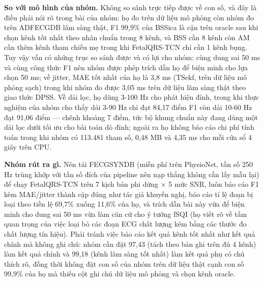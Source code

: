 \documentclass[12pt,a4paper]{article}
\begin{document}
\noindent \textbf{\color{tdtblue}So với mô hình của nhóm.} Không so sánh trực tiếp được về con số, và đây là điều phải nói rõ trong bài của nhóm: họ đo trên dữ liệu mô phỏng còn nhóm đo trên ADFECGDB lâm sàng thật, F1 99,9\% của BSSica là cận trên oracle sau khi chọn kênh tốt nhất theo nhãn chuẩn trong 8 kênh, và BSS cần 8 kênh còn AM cần thêm kênh tham chiếu mẹ trong khi FetalQRS-TCN chỉ cần 1 kênh bụng. Tuy vậy vẫn có những trục so sánh được và có lợi cho nhóm: cùng dung sai 50 ms và cùng công thức F1 nên nhóm được phép trích dẫn họ để biện minh cho lựa chọn 50 ms; về jitter, MAE tốt nhất của họ là 3,8 ms (TSekf, trên dữ liệu mô phỏng sạch) trong khi nhóm đo được 3,05 ms trên dữ liệu lâm sàng thật theo giao thức DPSS. Về dải lọc, họ dùng 3-100 Hz cho phát hiện đỉnh, trong khi thực nghiệm của nhóm cho thấy dải 3-90 Hz chỉ đạt 84,17 điểm F1 còn dải 10-60 Hz đạt 91,06 điểm — chênh khoảng 7 điểm, tức bộ khung chuẩn này đang dùng một dải lọc dưới tối ưu cho bài toán dò đỉnh; ngoài ra họ không báo cáo chi phí tính toán trong khi nhóm có 113.481 tham số, 0,48 MB và 4,35 ms cho mỗi cửa sổ 4 giây trên CPU.\par\vspace{3pt}
\noindent \textbf{\color{tdtblue}Nhóm rút ra gì.} Nên tải FECGSYNDB (miễn phí trên PhysioNet, tần số 250 Hz trùng khớp với tần số đích của pipeline nên nạp thẳng không cần lấy mẫu lại) để chạy FetalQRS-TCN trên 7 kịch bản phi dừng × 5 mức SNR, luôn báo cáo F1 kèm MAE/jitter thành cặp đúng như tác giả khuyến nghị, báo cáo tỉ lệ đoạn bị loại theo tiền lệ 69,7\% xuống 11,6\% của họ, và trích dẫn bài này vừa để biện minh cho dung sai 50 ms vừa làm căn cứ cho ý tưởng fSQI (họ viết rõ về tầm quan trọng của việc loại bỏ các đoạn ECG chất lượng kém bằng các thước đo chất lượng tín hiệu). Phải tránh việc báo cáo kết quả kênh tốt nhất như kết quả chính mà không ghi chú: nhóm cần đặt 97,43 (tách theo bản ghi trên đủ 4 kênh) làm kết quả chính và 99,18 (kênh lâm sàng tốt nhất) làm kết quả phụ có chú thích rõ, đồng thời không đặt con số của nhóm trên dữ liệu thật cạnh con số 99,9\% của họ mà thiếu cột ghi chú dữ liệu mô phỏng và chọn kênh oracle.\par\vspace{3pt}
\vspace{6pt}
\end{document}
